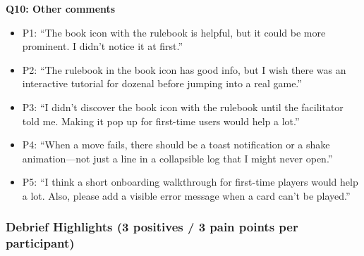 \documentclass[12pt, titlepage]{article}
\begin{document}
\noindent\textbf{Q10: Other comments}
\begin{itemize}
  \item P1: ``The book icon with the rulebook is helpful, but it could be more prominent. I didn't notice it at first.''
  \item P2: ``The rulebook in the book icon has good info, but I wish there was an interactive tutorial for dozenal before jumping into a real game.''
  \item P3: ``I didn't discover the book icon with the rulebook until the facilitator told me. Making it pop up for first-time users would help a lot.''
  \item P4: ``When a move fails, there should be a toast notification or a shake animation---not just a line in a collapsible log that I might never open.''
  \item P5: ``I think a short onboarding walkthrough for first-time players would help a lot. Also, please add a visible error message when a card can't be played.''
\end{itemize}

\subsubsection{Debrief Highlights (3 positives / 3 pain points per participant)}
\end{document}

